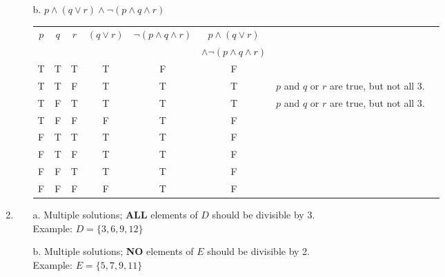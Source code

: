 \begin{enumerate}
\begin{itemize}
                \item[b.]   $p \land (q \lor r) \land \neg (p \land q \land r)$ \\
                            \begin{tabular}{c c c | c | c | c | c l}
                                $p$ & $q$ & $r$
                                    & \footnotesize  $(q \lor r)$
                                    & \footnotesize  $\neg(p \land q \land r)$
                                    & \footnotesize  $p \land (q \lor r)$
                                \\ & & & & &\footnotesize   $\land \neg (p \land q \land r)$
                                \\ \hline
                                    T & T & T           &   T   &  F     & F
                                \\  T & T & F           &   T   &  T     & T    & \footnotesize  $p$ and $q$ or $r$ are true, but not all 3.
                                \\  T & F & T           &   T   &  T     & T    & \footnotesize  $p$ and $q$ or $r$ are true, but not all 3.
                                \\  T & F & F           &   F   &  T     & F
                                \\  F & T & T           &   T   &  T     & F
                                \\  F & T & F           &   T   &  T     & F
                                \\  F & F & T           &   T   &  T     & F
                                \\  F & F & F           &   F   &  T     & F
                                
                            \end{tabular}
            \end{itemize}

        \item   
            \begin{itemize}
                \item[a.]   Multiple solutions; \textbf{ALL} elements of $D$ should be divisible by 3. \\
                            Example: $D = \{3, 6, 9, 12\}$
                            
                \item[b.]   Multiple solutions; \textbf{NO} elements of $E$ should be divisible by 2. \\
                            Example: $E = \{5, 7, 9, 11\}$
                            

\end{itemize}
\end{enumerate}
